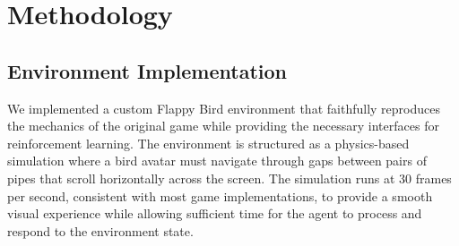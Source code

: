 \section{Methodology}

\subsection{Environment Implementation}

We implemented a custom Flappy Bird environment that faithfully reproduces the mechanics of the original game while providing the necessary interfaces for reinforcement learning. The environment is structured as a physics-based simulation where a bird avatar must navigate through gaps between pairs of pipes that scroll horizontally across the screen. The simulation runs at 30 frames per second, consistent with most game implementations, to provide a smooth visual experience while allowing sufficient time for the agent to process and respond to the environment state.

